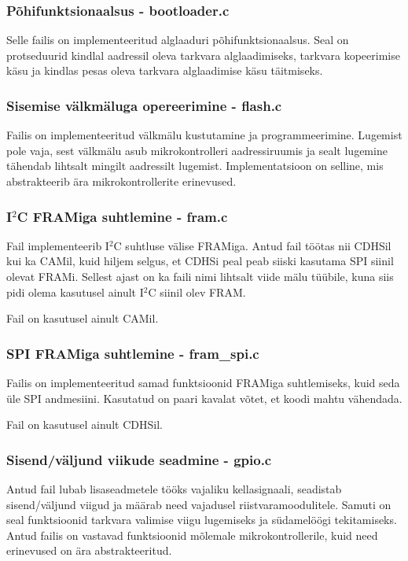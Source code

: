 \documentclass[12pt,a4paper]{article}
\newcommand{\iic}{I${}^2$C }
\begin{document}
\subsubsection{Põhifunktsionaalsus - \textbf{bootloader.c}}
Selle failis on implementeeritud alglaaduri põhifunktsionaalsus. Seal on
protseduurid kindlal aadressil oleva tarkvara alglaadimiseks, tarkvara
kopeerimise käsu ja kindlas pesas oleva tarkvara alglaadimise käsu täitmiseks.

\subsubsection{Sisemise välkmäluga opereerimine - \textbf{flash.c}}
Failis on implementeeritud välkmälu kustutamine ja programmeerimine.
Lugemist pole vaja, sest välkmälu asub mikrokontrolleri aadressiruumis ja sealt
lugemine tähendab lihtsalt mingilt aadressilt lugemist. Implementatsioon on
selline, mis abstrakteerib ära mikrokontrollerite erinevused.

\subsubsection{\texorpdfstring{\iic}{I2C} FRAMiga suhtlemine - \textbf{fram.c}}
Fail implementeerib \iic suhtluse välise FRAMiga. Antud fail töötas nii CDHSil
kui ka CAMil, kuid hiljem selgus, et CDHSi peal peab siiski kasutama SPI siinil
olevat FRAMi. Sellest ajast on ka faili nimi lihtsalt viide mälu tüübile, kuna
siis pidi olema kasutusel ainult \iic siinil olev FRAM.

Fail on kasutusel ainult CAMil.

\subsubsection{SPI FRAMiga suhtlemine - \textbf{fram\_spi.c}}
Failis on implementeeritud samad funktsioonid FRAMiga suhtlemiseks, kuid seda
üle SPI andmesiini. Kasutatud on paari kavalat võtet, et koodi mahtu vähendada.

Fail on kasutusel ainult CDHSil.

\subsubsection{Sisend/väljund viikude seadmine - \textbf{gpio.c}}
Antud fail lubab lisaseadmetele tööks vajaliku kellasignaali, seadistab
sisend/väljund viigud ja määrab need vajadusel riistvaramoodulitele. Samuti on
seal funktsioonid tarkvara valimise viigu lugemiseks ja südamelöögi
tekitamiseks. Antud failis on vastavad funktsioonid mõlemale mikrokontrollerile,
kuid need erinevused on ära abstrakteeritud.
\end{document}

